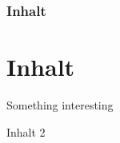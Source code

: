 \begin{frame}
\frametitle{Inhalt}
\section{Inhalt}
Something interesting\cite{aixbench}

\end{frame}

\begin{frame}{Inhalt 2}
\end{frame}